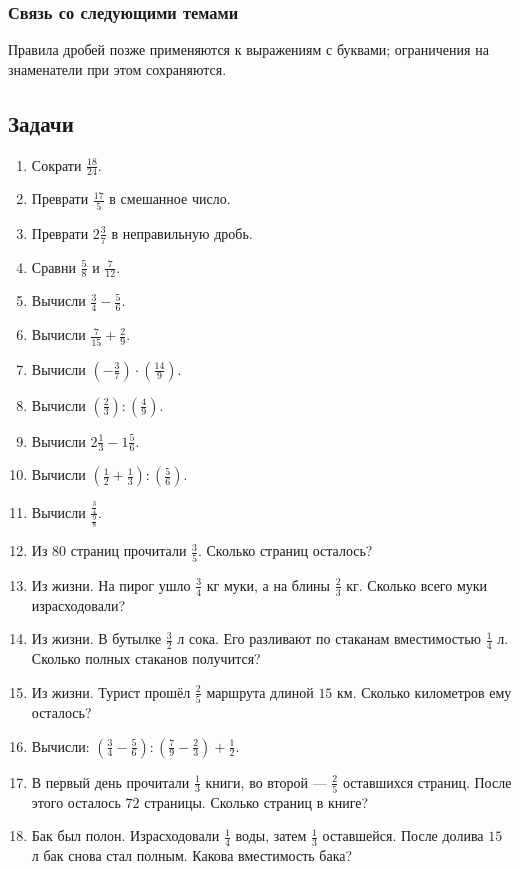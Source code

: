 \documentclass[12pt,a4paper]{article}
\theoremstyle{definition}
\theoremstyle{plain}
\theoremstyle{remark}
\newcommand{\starmark}{\ensuremath{{}^{\ast}}}
\begin{document}
\subsubsection*{Связь со следующими темами}
Правила дробей позже применяются к выражениям с буквами; ограничения на знаменатели при этом сохраняются.
\subsection*{Задачи}
\begin{enumerate}[label=\thesection.\arabic*.,leftmargin=2.8em,itemsep=12pt]
\item Сократи \(\frac{18}{24}\).
\item Преврати \(\frac{17}{5}\) в смешанное число.
\item Преврати \(2 \frac{3}{7}\) в неправильную дробь.
\item Сравни \(\frac{5}{8}\) и \(\frac{7}{12}\).
\item Вычисли \(\frac{3}{4} - \frac{5}{6}\).
\item Вычисли \(\frac{7}{15} + \frac{2}{9}\).
\item Вычисли \((- \frac{3}{7}) \cdot  (\frac{14}{9})\).
\item Вычисли \((\frac{2}{3}) : (\frac{4}{9})\).
\item Вычисли \(2 \frac{1}{3} - 1 \frac{5}{6}\).
\item Вычисли \((\frac{1}{2} + \frac{1}{3}) : (\frac{5}{6})\).
\item Вычисли \(\frac{\frac{3}{4}}{\frac{9}{8}}\).
\item Из \(80\) страниц прочитали \(\frac{3}{5}\). Сколько страниц осталось?
\item Из жизни. На пирог ушло \(\frac{3}{4}\) кг муки, а на блины \(\frac{2}{3}\) кг. Сколько всего муки израсходовали?
\item Из жизни. В бутылке \(\frac{3}{2}\) л сока. Его разливают по стаканам вместимостью \(\frac{1}{4}\) л. Сколько полных стаканов получится?
\item Из жизни. Турист прошёл \(\frac{2}{5}\) маршрута длиной \(15\) км. Сколько километров ему осталось?
\item[\textbf{3.16.}\starmark] Вычисли: \((\frac{3}{4} - \frac{5}{6}) : (\frac{7}{9} - \frac{2}{3}) + \frac{1}{2}\).
\item[\textbf{3.17.}\starmark] В первый день прочитали \(\frac{1}{3}\) книги, во второй — \(\frac{2}{5}\) оставшихся страниц. После этого осталось \(72\) страницы. Сколько страниц в книге?
\item[\textbf{3.18.}\starmark] Бак был полон. Израсходовали \(\frac{1}{4}\) воды, затем \(\frac{1}{3}\) оставшейся. После долива \(15\) л бак снова стал полным. Какова вместимость бака?
\end{enumerate}
\clearpage
\end{document}
